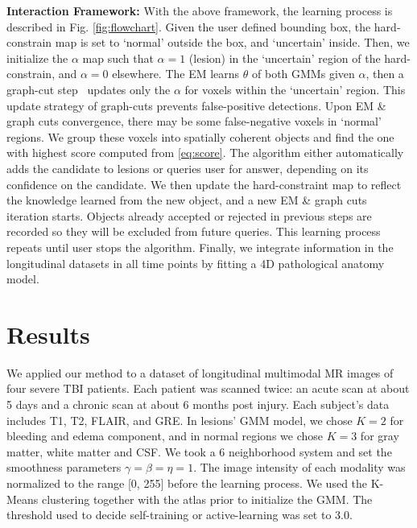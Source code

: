 \documentclass{article}
\begin{document}
\noindent\textbf{Interaction Framework: } With the above framework, the
learning process is described in Fig. \ref{fig:flowchart}. Given the user defined
bounding box, the hard-constrain map is set to `normal' outside the box, and
`uncertain' inside. Then, we initialize the $\alpha$ map such that $\alpha \!=
\!1$ (lesion) in the `uncertain' region of the hard-constrain, and $\alpha \!=
\!0$ elsewhere. The EM learns $\theta$ of both GMMs given $\alpha$, then a
graph-cut step~\cite{rother2004grabcut} updates only the $\alpha$ for voxels
within the `uncertain' region. This update strategy of graph-cuts prevents
false-positive detections. Upon EM \& graph cuts convergence, there may be some
false-negative voxels in `normal' regions. We group these voxels into spatially
coherent objects and find the one with highest score computed from
\eqref{eq:score}. The algorithm either automatically adds the candidate to
lesions or queries user for answer, depending on its confidence on the
candidate. We then update the hard-constraint map to reflect the knowledge
learned from the new object, and a new EM \& graph cuts iteration starts.
Objects already accepted or rejected in previous steps are recorded so they will
be excluded from future queries. This learning process repeats until
user stops the algorithm. Finally, we integrate information in the
longitudinal datasets in all time points by fitting a 4D pathological anatomy
model.

\section{Results}
\label{sec:results}
We applied our method to a dataset of longitudinal multimodal MR images of four
severe TBI patients.  Each patient was scanned twice: an acute scan at about 5
days and a chronic scan at about 6 months post injury. Each subject's data
includes T1, T2, FLAIR, and GRE. In lesions' GMM model, we chose $K=2$ for
bleeding and edema component, and in normal regions we chose $K=3$ for gray
matter, white matter and CSF. We took a 6 neighborhood system and set the
smoothness parameters $\gamma = \beta = \eta = 1$. The image intensity of each
modality was normalized to the range [0, 255] before the learning process. We
used the K-Means clustering together with the atlas prior to initialize the
GMM. The threshold used to decide self-training or active-learning was set to
3.0.
\end{document}

